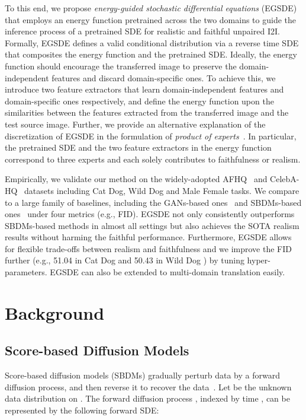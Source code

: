 \documentclass{article}
\begin{document}
To this end, we propose \emph{energy-guided stochastic differential equations} (EGSDE)
that employs an energy function pretrained across the two domains to guide the inference process of a pretrained SDE for realistic and faithful unpaired I2I. 
Formally, EGSDE defines a valid conditional distribution via a reverse time SDE that composites the energy function and the pretrained SDE. Ideally, the energy function should encourage the transferred image to preserve the domain-independent features and discard domain-specific ones.
To achieve this, we introduce two feature extractors that learn domain-independent features and domain-specific ones respectively, and define the energy function upon the similarities between the features extracted from the transferred image and the test source image. Further, we provide an alternative explanation of the discretization of EGSDE in the formulation of \emph{product of experts}~\cite{hinton2002training}. In particular, the pretrained SDE and the two feature extractors in the energy function correspond to three experts and each solely contributes to faithfulness or realism. 

Empirically, we validate our method on the  widely-adopted AFHQ~\cite{choi2020stargan} and CelebA-HQ~\cite{karras2018progressive}  datasets including Cat  Dog, Wild  Dog and Male  Female tasks. We compare to a large family of baselines, including the GANs-based ones~\cite{park2020contrastive,zhu2017unpaired,huang2018multimodal,lee2018diverse,benaim2017one,fu2019geometry,zheng2021spatially,zheng2022ittr} and SBDMs-based ones~\cite{choi2021ilvr,meng2021sdedit} under four metrics (e.g., FID). EGSDE not only consistently outperforms SBDMs-based methods in almost all settings but also achieves the SOTA realism results without harming the faithful performance. Furthermore, EGSDE allows for flexible trade-offs between realism and faithfulness and we improve the FID further (e.g., 51.04 in Cat  Dog and 50.43 in Wild  Dog ) by tuning hyper-parameters. EGSDE can also be extended to multi-domain translation easily. 

\section{Background}

\subsection{Score-based Diffusion Models}

Score-based diffusion models (SBDMs) gradually perturb data by a forward diffusion process, and then reverse it to recover the data~\cite{song2020score,bao2021analytic,song2021maximum,ho2020denoising,dhariwal2021diffusion}. Let  be the unknown data distribution on . The forward diffusion process , indexed by time , can be represented by the following forward SDE:
\end{document}
